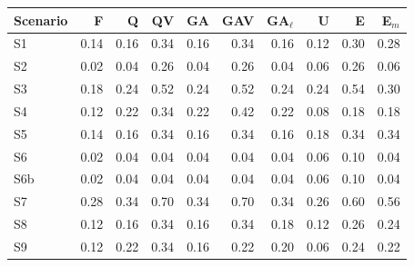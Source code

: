 \begin{tabular}{@{}lrrrrrrrrr@{}}
\toprule
Scenario & F & Q & QV & GA & GAV & GA$_\ell$ & U & E & E$_m$ \\
\midrule
S1 & 0.14 & 0.16 & 0.34 & 0.16 & 0.34 & 0.16 & 0.12 & 0.30 & 0.28 \\
S2 & 0.02 & 0.04 & 0.26 & 0.04 & 0.26 & 0.04 & 0.06 & 0.26 & 0.06 \\
S3 & 0.18 & 0.24 & 0.52 & 0.24 & 0.52 & 0.24 & 0.24 & 0.54 & 0.30 \\
S4 & 0.12 & 0.22 & 0.34 & 0.22 & 0.42 & 0.22 & 0.08 & 0.18 & 0.18 \\
S5 & 0.14 & 0.16 & 0.34 & 0.16 & 0.34 & 0.16 & 0.18 & 0.34 & 0.34 \\
S6 & 0.02 & 0.04 & 0.04 & 0.04 & 0.04 & 0.04 & 0.06 & 0.10 & 0.04 \\
S6b & 0.02 & 0.04 & 0.04 & 0.04 & 0.04 & 0.04 & 0.06 & 0.10 & 0.04 \\
S7 & 0.28 & 0.34 & 0.70 & 0.34 & 0.70 & 0.34 & 0.26 & 0.60 & 0.56 \\
S8 & 0.12 & 0.16 & 0.34 & 0.16 & 0.34 & 0.18 & 0.12 & 0.26 & 0.24 \\
S9 & 0.12 & 0.22 & 0.34 & 0.16 & 0.22 & 0.20 & 0.06 & 0.24 & 0.22 \\
\bottomrule
\end{tabular}